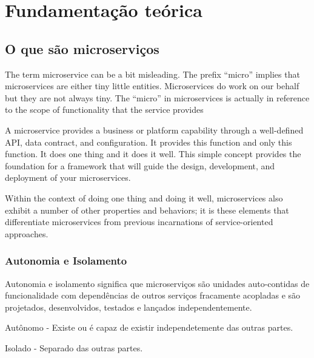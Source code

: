 \chapter{Fundamentação teórica}\label{cap_exemplos}


\section{O que são microserviços}

The term microservice can be a bit misleading. The prefix “micro” implies that microservices are either tiny little entities. Microservices do work on our behalf but they are not always tiny. The “micro” in microservices is actually in reference to the scope of functionality that the service provides

A microservice provides a business or platform capability through a well-defined API, data contract, and configuration. It provides this function and only this function. It does one thing and it does it well. This simple concept provides the foundation for a framework that will guide the design, development, and deployment of your microservices.

Within the context of doing one thing and doing it well, microservices also exhibit a number of other properties and behaviors; it is these elements that differentiate microservices from previous incarnations of service-oriented approaches.

\subsection{Autonomia e Isolamento}
Autonomia e isolamento significa que microserviços são unidades auto-contidas de funcionalidade com dependências de outros serviços fracamente acopladas e são projetados, desenvolvidos, testados e lançados independentemente.

Autônomo - Existe ou é capaz de existir independetemente das outras partes.

Isolado - Separado das outras partes. 


